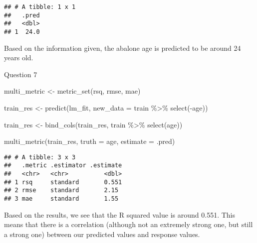 \documentclass[
]{article}
\newenvironment{Shaded}{\begin{snugshade}}{\end{snugshade}}
\newcommand{\AttributeTok}[1]{\textcolor[rgb]{0.77,0.63,0.00}{#1}}
\newcommand{\FunctionTok}[1]{\textcolor[rgb]{0.00,0.00,0.00}{#1}}
\newcommand{\NormalTok}[1]{#1}
\newcommand{\OtherTok}[1]{\textcolor[rgb]{0.56,0.35,0.01}{#1}}
\newcommand{\SpecialCharTok}[1]{\textcolor[rgb]{0.00,0.00,0.00}{#1}}
\begin{document}
\begin{verbatim}
## # A tibble: 1 x 1
##   .pred
##   <dbl>
## 1  24.0
\end{verbatim}

Based on the information given, the abalone age is predicted to be
around 24 years old.

Question 7

\begin{Shaded}
\begin{Highlighting}[]
\NormalTok{multi\_metric }\OtherTok{\textless{}{-}} \FunctionTok{metric\_set}\NormalTok{(rsq, rmse, mae)}

\NormalTok{train\_res }\OtherTok{\textless{}{-}} \FunctionTok{predict}\NormalTok{(lm\_fit, }\AttributeTok{new\_data =}\NormalTok{ train }\SpecialCharTok{\%\textgreater{}\%} 
                       \FunctionTok{select}\NormalTok{(}\SpecialCharTok{{-}}\NormalTok{age))}

\NormalTok{train\_res }\OtherTok{\textless{}{-}} \FunctionTok{bind\_cols}\NormalTok{(train\_res, train }\SpecialCharTok{\%\textgreater{}\%} 
                         \FunctionTok{select}\NormalTok{(age))}

\FunctionTok{multi\_metric}\NormalTok{(train\_res, }\AttributeTok{truth =}\NormalTok{ age, }
                \AttributeTok{estimate =}\NormalTok{ .pred)}
\end{Highlighting}
\end{Shaded}

\begin{verbatim}
## # A tibble: 3 x 3
##   .metric .estimator .estimate
##   <chr>   <chr>          <dbl>
## 1 rsq     standard       0.551
## 2 rmse    standard       2.15 
## 3 mae     standard       1.55
\end{verbatim}

Based on the results, we see that the R squared value is around 0.551.
This means that there is a correlation (although not an extremely strong
one, but still a strong one) between our predicted values and response
values.
\end{document}
